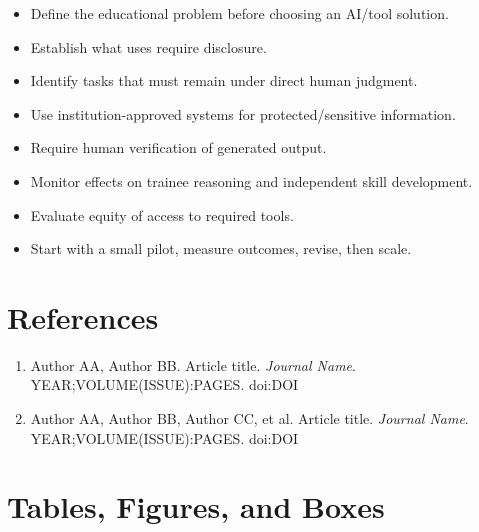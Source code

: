\documentclass[12pt]{article}
\begin{document}
\begin{itemize}[leftmargin=*]
	\item Define the educational problem before choosing an AI/tool solution.
	\item Establish what uses require disclosure.
	\item Identify tasks that must remain under direct human judgment.
	\item Use institution-approved systems for protected/sensitive information.
	\item Require human verification of generated output.
	\item Monitor effects on trainee reasoning and independent skill development.
	\item Evaluate equity of access to required tools.
	\item Start with a small pilot, measure outcomes, revise, then scale.
\end{itemize}


\section*{References}

%
%

\begin{enumerate}
	\item Author AA, Author BB. Article title. \textit{Journal Name}.
	      YEAR;VOLUME(ISSUE):PAGES. doi:DOI
	\item Author AA, Author BB, Author CC, et al. Article title.
	      \textit{Journal Name}. YEAR;VOLUME(ISSUE):PAGES. doi:DOI
\end{enumerate}


\clearpage
\section*{Tables, Figures, and Boxes}
\end{document}
